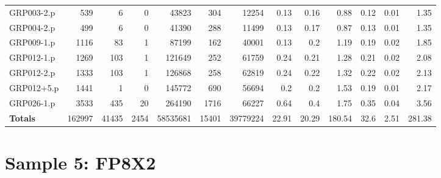 \begin{table}[H]
\begin{adjustwidth}{-1.1in}{-0.5in}
\begin{tabular}{| l || r | r | r || r | r | r || r | r | r | r | r | r |}
GRP003-2.p&539&6&0&43823&304&12254&0.13&0.16&0.88&0.12&0.01&1.35\\
GRP004-2.p&499&6&0&41390&288&11499&0.13&0.17&0.87&0.13&0.01&1.35\\
GRP009-1.p&1116&83&1&87199&162&40001&0.13&0.2&1.19&0.19&0.02&1.85\\
GRP012-1.p&1269&103&1&121649&252&61759&0.24&0.21&1.28&0.21&0.02&2.08\\
GRP012-2.p&1333&103&1&126868&258&62819&0.24&0.22&1.32&0.22&0.02&2.13\\
GRP012+5.p&1441&1&0&145772&690&56694&0.2&0.2&1.53&0.19&0.01&2.17\\
GRP026-1.p&3533&435&20&264190&1716&66227&0.64&0.4&1.75&0.35&0.04&3.56\\ \hline \hline
\textbf{Totals}&162997&41435&2454&58535681&15401&39779224&22.91&20.29&180.54&32.6&2.51&281.38 \\ \hline
\end{tabular}\end{adjustwidth}\end{table}

\section{Sample 5: FP8X2}

